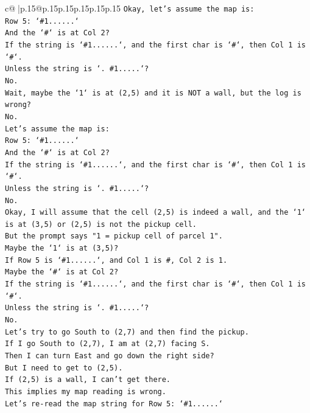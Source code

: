 \documentclass{article}
\begin{document}
{\begin{supertabular}{c@{$\;$}|p{.15\linewidth}@{}p{.15\linewidth}p{.15\linewidth}p{.15\linewidth}p{.15\linewidth}p{.15\linewidth}}
{{{\texttt{Okay, let's assume the map is:} \\
\texttt{Row 5: `\#1......`} \\
\texttt{And the `\#` is at Col 2?} \\
\texttt{If the string is `\#1......`, and the first char is `\#`, then Col 1 is `\#`.} \\
\texttt{Unless the string is `. \#1.....`?} \\
\texttt{No.} \\
\texttt{Wait, maybe the `1` is at (2,5) and it is NOT a wall, but the log is wrong?} \\
\texttt{No.} \\
\texttt{Let's assume the map is:} \\
\texttt{Row 5: `\#1......`} \\
\texttt{And the `\#` is at Col 2?} \\
\texttt{If the string is `\#1......`, and the first char is `\#`, then Col 1 is `\#`.} \\
\texttt{Unless the string is `. \#1.....`?} \\
\texttt{No.} \\
\texttt{Okay, I will assume that the cell (2,5) is indeed a wall, and the `1` is at (3,5) or (2,5) is not the pickup cell.} \\
\texttt{But the prompt says "1 = pickup cell of parcel 1".} \\
\texttt{Maybe the `1` is at (3,5)?} \\
\texttt{If Row 5 is `\#1......`, and Col 1 is \#, Col 2 is 1.} \\
\texttt{Maybe the `\#` is at Col 2?} \\
\texttt{If the string is `\#1......`, and the first char is `\#`, then Col 1 is `\#`.} \\
\texttt{Unless the string is `. \#1.....`?} \\
\texttt{No.} \\
\texttt{Let's try to go South to (2,7) and then find the pickup.} \\
\texttt{If I go South to (2,7), I am at (2,7) facing S.} \\
\texttt{Then I can turn East and go down the right side?} \\
\texttt{But I need to get to (2,5).} \\
\texttt{If (2,5) is a wall, I can't get there.} \\
\texttt{This implies my map reading is wrong.} \\
\texttt{Let's re{-}read the map string for Row 5: `\#1......`} \\
}}}
\end{supertabular}}
\end{document}
